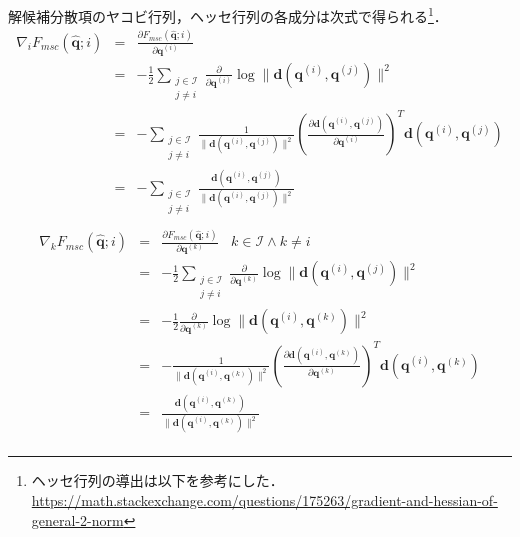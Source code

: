 解候補分散項のヤコビ行列，ヘッセ行列の各成分は次式で得られる\footnote{ヘッセ行列の導出は以下を参考にした．\url{https://math.stackexchange.com/questions/175263/gradient-and-hessian-of-general-2-norm}}．
\begin{subequations}
\begin{eqnarray}
  \nabla_i F_{\mathit{msc}}(\bm{\hat{q}}; i) &=& \frac{\partial F_{\mathit{msc}}(\bm{\hat{q}}; i)}{\partial \bm{q}^{(i)}} \\
  &=& - \frac{1}{2} \sum_{\substack{j \in \mathcal{I} \\ j \not= i}} \frac{\partial}{\partial \bm{q}^{(i)}} \log \| \bm{d}(\bm{q}^{(i)}, \bm{q}^{(j)}) \|^2 \\
  &=& - \sum_{\substack{j \in \mathcal{I} \\ j \not= i}} \frac{1}{\| \bm{d}(\bm{q}^{(i)}, \bm{q}^{(j)}) \|^2} \left( \frac{\partial \bm{d}(\bm{q}^{(i)}, \bm{q}^{(j)})}{\partial \bm{q}^{(i)}} \right)^T \bm{d}(\bm{q}^{(i)}, \bm{q}^{(j)})\\
  &=& - \sum_{\substack{j \in \mathcal{I} \\ j \not= i}} \frac{\bm{d}(\bm{q}^{(i)}, \bm{q}^{(j)})}{\| \bm{d}(\bm{q}^{(i)}, \bm{q}^{(j)}) \|^2} \\
\end{eqnarray}
\end{subequations}
\begin{subequations}
\begin{eqnarray}
  \nabla_k F_{\mathit{msc}}(\bm{\hat{q}}; i) &=& \frac{\partial F_{\mathit{msc}}(\bm{\hat{q}}; i)}{\partial \bm{q}^{(k)}} \ \ \ \ k \in \mathcal{I} \land k \not= i \\
  &=& - \frac{1}{2} \sum_{\substack{j \in \mathcal{I} \\ j \not= i}} \frac{\partial}{\partial \bm{q}^{(k)}} \log \| \bm{d}(\bm{q}^{(i)}, \bm{q}^{(j)}) \|^2 \\
  &=& - \frac{1}{2} \frac{\partial}{\partial \bm{q}^{(k)}} \log \| \bm{d}(\bm{q}^{(i)}, \bm{q}^{(k)}) \|^2 \\
  &=& - \frac{1}{\| \bm{d}(\bm{q}^{(i)}, \bm{q}^{(k)}) \|^2} \left( \frac{\partial \bm{d}(\bm{q}^{(i)}, \bm{q}^{(k)})}{\partial \bm{q}^{(k)}} \right)^T \bm{d}(\bm{q}^{(i)}, \bm{q}^{(k)})\\
  &=& \frac{\bm{d}(\bm{q}^{(i)}, \bm{q}^{(k)})}{\| \bm{d}(\bm{q}^{(i)}, \bm{q}^{(k)}) \|^2} \\
\end{eqnarray}
\end{subequations}
